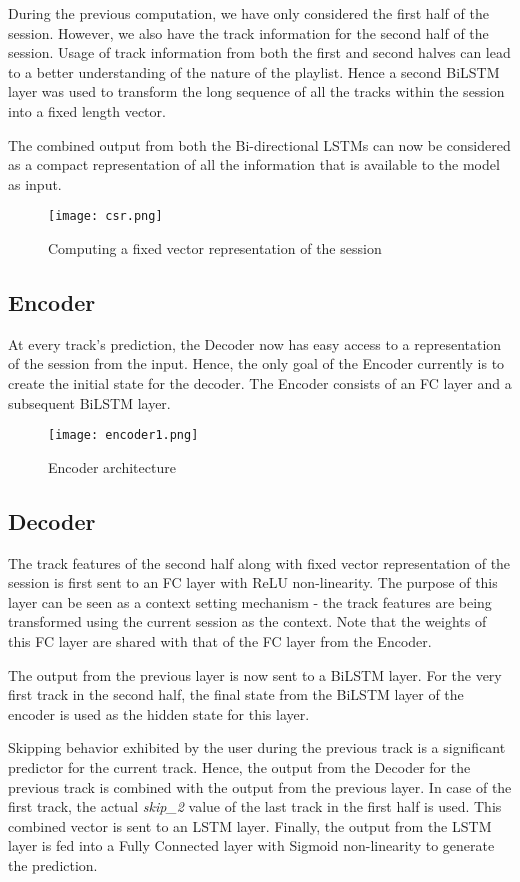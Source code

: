 \documentclass[sigconf]{acmart}
\begin{document}
During the previous computation, we have only considered the first half of the session. However, we also have the track information for the second half of the session. Usage of track information from both the first and second halves can lead to a better understanding of the nature of the playlist. Hence a second BiLSTM layer was used to transform the long sequence of all the tracks within the session into a fixed length vector.

The combined output from both the Bi-directional LSTMs can now be considered as a compact representation of all the information that is available to the model as input.

\begin{figure}[h]
\caption{Computing a fixed vector representation of the session}
\centering
\texttt{[image: csr.png]}
\end{figure}

\subsection{Encoder}
At every track's prediction, the Decoder now has easy access to a representation of the session from the input. Hence, the only goal of the Encoder currently is to create the initial state for the decoder. The Encoder consists of an FC layer and a subsequent BiLSTM layer.

\begin{figure}[h]
\caption{Encoder architecture}
\centering
\texttt{[image: encoder1.png]}
\end{figure}

\subsection{Decoder}
The track features of the second half along with fixed vector representation of the session is first sent to an FC layer with ReLU non-linearity. The purpose of this layer can be seen as a context setting mechanism - the track features are being transformed using the current session as the context. Note that the weights of this FC layer are shared with that of the FC layer from the Encoder. 

The output from the previous layer is now sent to a BiLSTM layer. For the very first track in the second half, the final state from the BiLSTM layer of the encoder is used as the hidden state for this layer.

Skipping behavior exhibited by the user during the previous track is a significant predictor for the current track. Hence, the output from the Decoder for the previous track is combined with the output from the previous layer. In case of the first track, the actual \textit{skip\_2} value of the last track in the first half is used. This combined vector is sent to an LSTM layer. Finally, the output from the LSTM layer is fed into a Fully Connected layer with Sigmoid non-linearity to generate the prediction.
\end{document}
